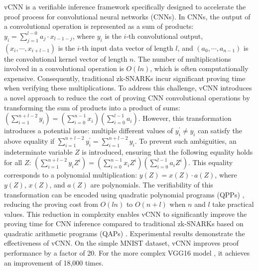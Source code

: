 \documentclass[journal]{IEEEtran}
\begin{document}
vCNN \cite{lee2024vcnn} is a verifiable inference framework specifically designed to accelerate the proof process for convolutional neural networks (CNNs). In CNNs, the output of a convolutional operation is represented as a sum of products: $y_i = \sum\nolimits_{j = 1}^{l - 0} {a_j \cdot x_{l - 1 - j}}$, where \(y_i\) is the \(i\)-th convolutional output, \(\left( x_i, \cdots, x_{i+l-1} \right)\) is the \(i\)-th input data vector of length \(l\), and \(\left( a_0, \cdots, a_{n-1} \right)\) is the convolutional kernel vector of length \(n\). The number of multiplications involved in a convolutional operation is \(O(ln)\), which is often computationally expensive. Consequently, traditional zk-SNARKs incur significant proving time when verifying these multiplications. To address this challenge, vCNN introduces a novel approach to reduce the cost of proving CNN convolutional operations by transforming the sum of products into a product of sums: $\left( \sum\nolimits_{i = 1}^{n + l - 2} y_i \right) = \left( \sum\nolimits_{i = 0}^{n - 1} x_i \right) \left( \sum\nolimits_{i = 0}^{l - 1} a_i \right)$. However, this transformation introduces a potential issue: multiple different values of \(y_i^\prime \neq y_i\) can satisfy the above equality if \(\sum\nolimits_{i = 1}^{n + l - 2} y_i^\prime = \sum\nolimits_{i = 1}^{n + l - 2} y_i\). To prevent such ambiguities, an indeterminate variable \(Z\) is introduced, ensuring that the following equality holds for all \(Z\): $\left( \sum\nolimits_{i = 1}^{n + l - 2} y_i Z^i \right) = \left( \sum\nolimits_{i = 0}^{n - 1} x_i Z^i \right) \left( \sum\nolimits_{i = 0}^{l - 1} a_i Z^i \right)$. This equality corresponds to a polynomial multiplication: $y(Z) = x(Z) \cdot a(Z)$, where \(y(Z)\), \(x(Z)\), and \(a(Z)\) are polynomials. The verifiability of this transformation can be encoded using quadratic polynomial programs (QPPs) \cite{kosba2014trueset}, reducing the proving cost from \(O(ln)\) to \(O(n + l)\) when \(n\) and \(l\) take practical values. This reduction in complexity enables vCNN to significantly improve the proving time for CNN inference compared to traditional zk-SNARKs based on quadratic arithmetic programs (QAPs) \cite{burkard1984quadratic}. Experimental results demonstrate the effectiveness of vCNN. On the simple MNIST dataset, vCNN improves proof performance by a factor of 20. For the more complex VGG16 model \cite{simonyan2014very}, it achieves an improvement of 18,000 times.
\end{document}
